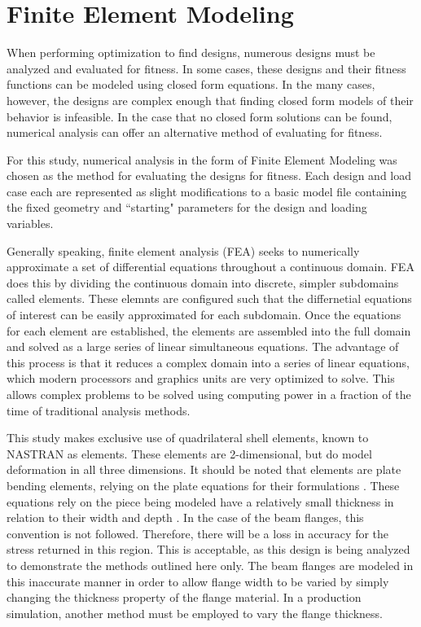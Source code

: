 \section{Finite Element Modeling}

When performing optimization to find designs, numerous designs must be analyzed and evaluated for fitness. In some cases, these designs and their fitness functions can be modeled using closed form equations. In the many cases, however, the designs are complex enough that finding closed form models of their behavior is infeasible. In the case that no closed form solutions can be found, numerical analysis can offer an alternative method of evaluating for fitness. 

For this study, numerical analysis in the form of Finite Element Modeling was chosen as the method for evaluating the designs for fitness. Each design and load case each are represented as slight modifications to a basic model file containing the fixed geometry and ``starting" parameters for the design and loading variables. 

Generally speaking, finite element analysis (FEA) seeks to numerically approximate a set of differential equations throughout a continuous domain. FEA does this by dividing the continuous domain into discrete, simpler subdomains called elements. These elemnts are configured such that the differnetial equations of interest can be easily approximated for each subdomain. Once the equations for each element are established, the elements are assembled into the full domain and solved as a large series of linear simultaneous equations. The advantage of this process is that it reduces a complex domain into a series of linear equations, which modern processors and graphics units are very optimized to solve. This allows complex problems to be solved using computing power in a fraction of the time of traditional analysis methods. \cite{reddy}

This study makes exclusive use of quadrilateral shell elements, known to NASTRAN as  elements. These elements are 2-dimensional, but do model deformation in all three dimensions. It should be noted that  elements are plate bending elements, relying on the plate equations for their formulations \cite{nastran-qrg}. These equations rely on the piece being modeled have a relatively small thickness in relation to their width and depth \cite{reddy}. In the case of the beam flanges, this convention is not followed. Therefore, there will be a loss in accuracy for the stress returned in this region. This is acceptable, as this design is being analyzed to demonstrate the methods outlined here only. The beam flanges are modeled in this inaccurate manner in order to allow flange width to be varied by simply changing the thickness property of the flange material. In a production simulation, another method must be employed to vary the flange thickness.  

